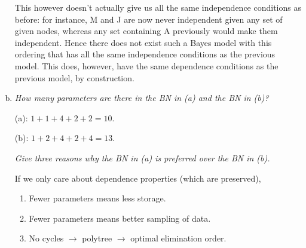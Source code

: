 \documentclass{article}
\begin{document}
\begin{enumerate}[(a)]
\begin{center}
  \end{center}
  This however doesn't actually give us all the same independence
  conditions as before: for instance, M and J are now never
  independent given any set of given nodes, whereas any set containing
  A previously would make them independent.  Hence there does not
  exist such a Bayes model with this ordering that has all the same
  independence conditions as the previous model.  This does, however,
  have the same dependence conditions as the previous model, by
  construction.
\item \textit{How many parameters are there in the BN in (a) and the
  BN in (b)?}

  (a): $1+1+4+2+2=10$.

  (b): $1+2+4+2+4=13$.

  \textit{Give three reasons why the BN in (a) is preferred over the
    BN in (b).}

  If we only care about dependence properties (which are preserved),
  \begin{enumerate}
  \item Fewer parameters means less storage.
  \item Fewer parameters means better sampling of data.
  \item No cycles $\rightarrow$ polytree $\rightarrow$ optimal
    elimination order.
  \end{enumerate}

\end{enumerate}
\end{document}
